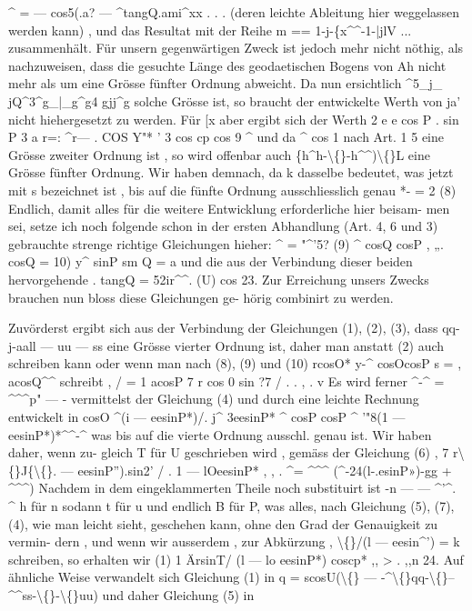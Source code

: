 \documentclass[12pt,a4paper]{article}
\begin{document}
\^{}  =  --- cos5(.a? --- \^{}tangQ.ami\^{}xx   .    .    . (deren  leichte  Ableitung  hier  weggelassen  werden  kann) ,  und  das  Resultat  mit der  Reihe m  ==  1-j-\{x\^{}\^{}-1-|jlV  ... zusammenhält.  Für  unsern  gegenwärtigen  Zweck  ist  jedoch  mehr  nicht  nöthig, als  nachzuweisen,  dass  die  gesuchte  Länge  des  geodaetischen  Bogens  von  Ah nicht  mehr  als  um  eine  Grösse  fünfter  Ordnung  abweicht.  Da  nun  ersichtlich \^{}5\_j\_  jQ\^{}3\^{}g\_|\_g\^{}g4  gjj\^{}g  solche  Grösse  ist,  so  braucht  der  entwickelte  Werth von  ja'  nicht  hiehergesetzt  zu  werden.     Für  [x  aber  ergibt  sich  der  Werth 2  e  e  cos  P .  sin  P  3 a  r=:   \^{}r---  .  COS  Y"* '  3  cos  cp  cos  9  \^{} und  da  \^{}  cos  1  nach  Art.  1 5  eine  Grösse  zweiter  Ordnung  ist ,  so  wird  offenbar auch    \{h\^{}h-\textbackslash\{\}-h\^{}\^{})\textbackslash\{\}L   eine  Grösse  fünfter  Ordnung. Wir  haben  demnach,  da  k  dasselbe  bedeutet,  was  jetzt  mit  s  bezeichnet ist ,  bis  auf  die  fünfte  Ordnung  ausschliesslich  genau *-  =  2 (8) Endlich,  damit  alles  für  die  weitere  Entwicklung  erforderliche  hier  beisam- men sei,  setze  ich  noch  folgende  schon  in  der  ersten  Abhandlung  (Art.  4,  6  und  3) gebrauchte  strenge  richtige  Gleichungen  hieher: \^{}  =  "\^{}'5? (9) \^{}  cosQ  cosP  ,    „. cosQ  = 10) y\^{}  sinP sm  Q  = a und  die  aus  der  Verbindung  dieser  beiden  hervorgehende .         tangQ  =  52ir\^{}\^{}.   (U) cos 23. Zur  Erreichung  unsers  Zwecks  brauchen  nun  bloss  diese  Gleichungen  ge- hörig combinirt  zu  werden.

Zuvörderst  ergibt  sich  aus  der  Verbindung  der  Gleichungen  (1),  (2),  (3), dass  qq-j-aall --- uu  ---  ss  eine  Grösse  vierter  Ordnung  ist,  daher  man  anstatt (2)  auch  schreiben  kann oder  wenn  man  nach  (8),  (9)  und  (10) rcosO*  y-\^{}  cosOcosP s  =   ,       acosQ\^{}\^{} schreibt , /  =  1 acosP 7  r  cos  0  sin  ?7  / .  .  ,      .  v Es  wird  ferner  \^{}-\^{}  =  \^{}\^{}\^{}p" --- -  vermittelst  der  Gleichung  (4)  und  durch  eine leichte  Rechnung  entwickelt  in cosO       \^{}(i  ---  eesinP*)/.  j\^{}       3eesinP*  \^{} cosP  cosP  \^{}      '"8(1  --- eesinP*)*\^{}\^{}-\^{} was  bis  auf  die  vierte  Ordnung  ausschl.  genau  ist.  Wir  haben  daher,  wenn  zu- gleich  T  für   U  geschrieben  wird ,  gemäss  der  Gleichung  (6) , 7          r\textbackslash\{\}J\{\textbackslash\{\}.  ---  eesinP'').sin2' / .  1  ---  lOeesinP*  ,      ,  . \^{}=      \^{}\^{}\^{}   (\^{}-24(l-.esinP»)-gg  +  \^{}\^{}\^{}) Nachdem  in  dem  eingeklammerten  Theile  noch  substituirt  ist  -n --- --- \^{}'\^{}.  \^{}  h  für  n sodann  t  für  u  und  endlich  B  für  P,  was  alles,  nach  Gleichung  (5),  (7),  (4), wie  man  leicht  sieht,  geschehen  kann,  ohne  den  Grad  der  Genauigkeit  zu  vermin- dern ,  und  wenn  wir  ausserdem ,  zur  Abkürzung , \textbackslash\{\}/(l  --- eesin\^{}')  =  k schreiben,  so  erhalten  wir  (1) 1     ÄrsinT/  (l  ---  lo  eesinP*)  coscp*     ,,     >       .     ,,n 24. Auf  ähnliche  Weise  verwandelt  sich  Gleichung  (1)  in q  =  scosU(\textbackslash\{\}  ---  -\^{}\textbackslash\{\}qq-\textbackslash\{\}--\^{}\^{}ss-\textbackslash\{\}-\textbackslash\{\}uu) und  daher  Gleichung  (5)  in
\end{document}
